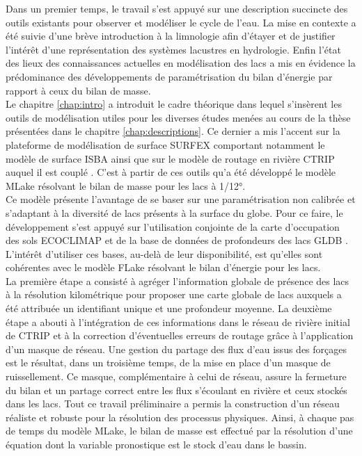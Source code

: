 Dans un premier temps, le travail s'est appuyé sur une description succincte des outils existants pour observer et modéliser le cycle de l'eau. La mise en contexte a été suivie d'une brève introduction à la limnologie afin d'étayer et de justifier l'intérêt d'une représentation des systèmes lacustres en hydrologie. Enfin l'état des lieux des connaissances actuelles en modélisation des lacs a mis en évidence la prédominance des développements de paramétrisation du bilan d'énergie par rapport à ceux du bilan de masse.\\

Le chapitre \ref{chap:intro} a introduit le cadre théorique dans lequel s'insèrent les outils de modélisation utiles pour les diverses études menées au cours de la thèse présentées dans le chapitre \ref{chap:descriptions}. Ce dernier a mis l'accent sur la plateforme de modélisation de surface SURFEX \citep{masson2000} comportant notamment le modèle de surface ISBA \citep{noilhan1989} ainsi que sur le modèle de routage en rivière CTRIP auquel il est couplé \citep{decharme2019}. C'est à partir de ces outils qu'a été développé le modèle MLake résolvant le bilan de masse pour les lacs à 1/12°.\\
Ce modèle présente l'avantage de se baser sur une paramétrisation non calibrée et s'adaptant à la diversité de lacs présents à la surface du globe. Pour ce faire, le développement s'est appuyé sur l'utilisation conjointe de la carte d'occupation des sols ECOCLIMAP \citep{faroux2013} et de la base de données de profondeurs des lacs GLDB \citep{choulga2019}. L'intérêt d'utiliser ces bases, au-delà de leur disponibilité, est qu'elles sont cohérentes avec le modèle FLake \citep{mironov2008} résolvant le bilan d'énergie pour les lacs.\\
La première étape a consisté à agréger l'information globale de présence des lacs à la résolution kilométrique pour proposer une carte globale de lacs auxquels a été attribuée un identifiant unique et une profondeur moyenne. La deuxième étape a abouti à l'intégration de ces informations dans le réseau de rivière initial de CTRIP et à la correction d'éventuelles erreurs de routage grâce à l'application d'un masque de réseau. Une gestion du partage des flux d'eau issus des forçages est le résultat, dans un troisième temps, de la mise en place d'un masque de ruissellement. Ce masque, complémentaire à celui de réseau, assure la fermeture du bilan et un partage correct entre les flux s'écoulant en rivière et ceux stockés dans les lacs. Tout ce travail préliminaire a permis la construction d'un réseau réaliste et robuste pour la résolution des processus physiques. Ainsi, à chaque pas de temps du modèle MLake, le bilan de masse est effectué par la résolution d'une équation dont la variable pronostique est le stock d'eau dans le bassin.\\

